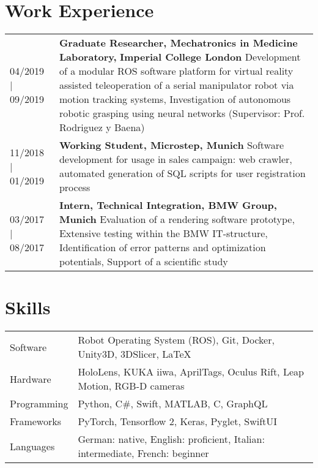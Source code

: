 \documentclass{article}
\begin{document}
\section*{Work Experience}
\begin{tabularx}{\textwidth}{@{}lX}

04/2019 | 09/2019 &  \textbf{Graduate Researcher, Mechatronics in Medicine Laboratory, } \newline 
					 \textbf{Imperial College London} \newline
					 Development of a modular ROS software platform for virtual reality assisted teleoperation of a serial manipulator robot via motion tracking systems, Investigation of autonomous robotic grasping using neural networks (Supervisor: Prof. Rodriguez y Baena) \\
11/2018 | 01/2019 &  \textbf{Working Student, Microstep, Munich} \newline
                  	 Software development for usage in sales campaign: web crawler, automated generation of SQL scripts for user registration process \\
03/2017 | 08/2017 &  \textbf{Intern, Technical Integration, BMW Group, Munich} \newline
                  	 Evaluation of a rendering software prototype, Extensive testing within the BMW IT-structure, Identification of error patterns and optimization potentials, Support of a scientific study \\
\end{tabularx}

\setlength{\extrarowheight}{3pt}

\section*{Skills}
\begin{tabularx}{\textwidth}{@{}lX}

Software &  Robot Operating System (ROS), Git, Docker, Unity3D, 3DSlicer, \LaTeX \\
Hardware & HoloLens, KUKA iiwa, AprilTags, Oculus Rift, Leap Motion, RGB-D cameras \\
Programming & Python, C\#, Swift, MATLAB, C, GraphQL  \\
Frameworks & PyTorch, Tensorflow 2, Keras, Pyglet, SwiftUI \\
Languages & German: native, English: proficient, Italian: intermediate, French: beginner 
\end{tabularx}
\end{document}
